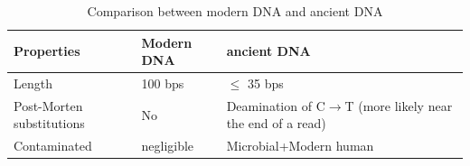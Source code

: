 \documentclass[11pt,a4paper]{report}
\begin{document}
\begin{table}[H]
  \begin{tabular}{ |  p{4cm} | p{2cm} | p{5cm} |}
    \hline
  \textbf{  Properties} & \textbf{Modern DNA } &\textbf{ ancient DNA} \\ \hline
       Length &  100 bps  & $\leq$  35 bps \\ \hline
       Post-Morten substitutions & No  & Deamination of C$\to$T
(more likely near the end of a read) \\ \hline
  Contaminated & negligible & Microbial+Modern human\\ \hline
    \end{tabular}
\caption{Comparison between modern DNA and ancient DNA}
\label{aDNAchar}
\end{table}

\end{document}
